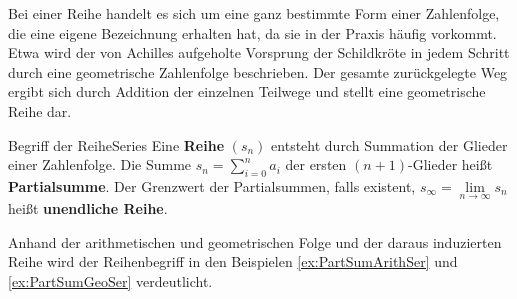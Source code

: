 Bei einer Reihe handelt es sich um eine ganz bestimmte Form einer Zahlenfolge, die eine eigene Bezeichnung erhalten hat, da sie in der Praxis häufig vorkommt. Etwa wird der von Achilles aufgeholte Vorsprung der Schildkröte in jedem Schritt durch eine geometrische Zahlenfolge beschrieben. Der gesamte zurückgelegte Weg ergibt sich durch Addition der einzelnen Teilwege und stellt eine geometrische Reihe dar.

\begin{definition}{Begriff der Reihe}{Series}
	Eine \textbf{Reihe} $(s_n)$ entsteht durch Summation der Glieder einer Zahlenfolge. Die Summe $s_n=\sum\limits_{i=0}^n a_i$ der ersten $(n+1)$-Glieder heißt \textbf{Partialsumme}. Der Grenzwert der Partialsummen, falls existent, $s_\infty = \lim\limits_{n\to\infty}s_n$ heißt \textbf{unendliche Reihe}.
\end{definition}

Anhand der arithmetischen und geometrischen Folge und der daraus induzierten Reihe wird der Reihenbegriff in den Beispielen \ref{ex:PartSumArithSer} und \ref{ex:PartSumGeoSer} verdeutlicht.

